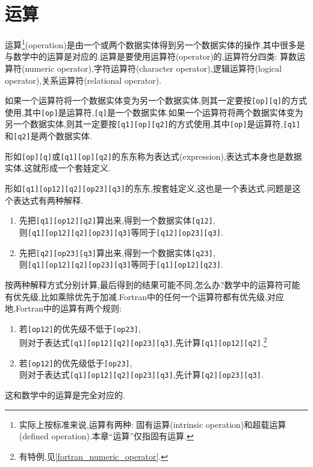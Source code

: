 \section{运算}\label{fortran_opration}

运算\footnote{
    实际上按标准来说,运算有两种: 固有运算(intrinsic operation)和超载运算(defined operation).本章``运算''仅指固有运算.
}(operation)是由一个或两个数据实体得到另一个数据实体的操作,其中很多是与数学中的运算是对应的.运算是要使用运算符(operator)的,运算符分四类: 算数运算符(numeric operator),字符运算符(character operator),逻辑运算符(logical operator),关系运算符(relational operator).

如果一个运算符将一个数据实体变为另一个数据实体,则其一定要按\texttt{[op][q]}的方式使用,其中\texttt{[op]}是运算符,\texttt{[q]}是一个数据实体.如果一个运算符将两个数据实体变为另一个数据实体,则其一定要按\texttt{[q1][op][q2]}的方式使用,其中\texttt{[op]}是运算符,\texttt{[q1]}和\texttt{[q2]}是两个数据实体.

形如\texttt{[op][q]}或\texttt{[q1][op][q2]}的东东称为表达式(expression),表达式本身也是数据实体,这就形成一个套娃定义.

形如\texttt{[q1][op12][q2][op23][q3]}的东东,按套娃定义,这也是一个表达式.问题是这个表达式有两种解释.
\begin{enumerate}
    \item 先把\texttt{[q1][op12][q2]}算出来,得到一个数据实体\texttt{[q12]},\\则\texttt{[q1][op12][q2][op23][q3]}等同于\texttt{[q12][op23][q3]}.
    \item 先把\texttt{[q2][op23][q3]}算出来,得到一个数据实体\texttt{[q23]},\\则\texttt{[q1][op12][q2][op23][q3]}等同于\texttt{[q1][op12][q23]}.
\end{enumerate}
按两种解释方式分别计算,最后得到的结果可能不同,怎么办?数学中的运算符可能有优先级,比如乘除优先于加减.Fortran中的任何一个运算符都有优先级,对应地,Fortran中的运算有两个规则:
\begin{enumerate}
    \item 若\texttt{[op12]}的优先级不低于\texttt{[op23]},\\则对于表达式\texttt{[q1][op12][q2][op23][q3]},先计算\texttt{[q1][op12][q2]}.\footnote{
        有特例,见\ref{fortran_numeric_operator}.
    }
    \item 若\texttt{[op12]}的优先级低于\texttt{[op23]},\\则对于表达式\texttt{[q1][op12][q2][op23][q3]},先计算\texttt{[q2][op23][q3]}.
\end{enumerate}
这和数学中的运算是完全对应的.


